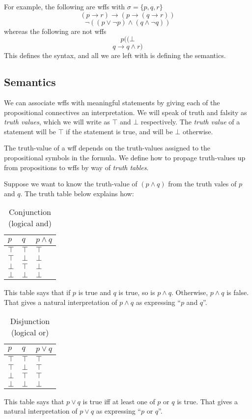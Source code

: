For example, the following are wffs with $\sigma = \{p, q, r\}$
\[
  (p \rightarrow r) \rightarrow (p \rightarrow (q \rightarrow r))
\]
\[
  \lnot((p \vee \lnot p) \land (q \land \lnot q))
\]
whereas the following are not wffs
\[
  p((\bot
\]
\[
  q \rightarrow q \land r)
\]
This defines the syntax, and all we are left with is defining the semantics. 

\subsection*{Semantics}
We can associate wffs with meaningful statements by giving each of the propositional connectives an interpretation. We will speak of truth and falsity as \emph{truth values}, which we will write as $\top$ and $\bot$ respectively. The \emph{truth value} of a statement will be $\top$ if the statement is true, and will be $\bot$ otherwise. 

The truth-value of a wff depends on the truth-values assigned to the propositional symbols in the formula. We define how to propage truth-values up from propositions to wffs by way of \emph{truth tables}.

Suppose we want to know the truth-value of $(p \land q)$ from the truth vales of $p$ and $q$. The truth table below explains how:

\begin{table}[h!]
\centering
\caption{Conjunction (logical and)}
\begin{tabular}{l|l|l}
$p$    & $q$    & $p \land q$ \\ \hline
$\top$ & $\top$ &  $\top$     \\
$\top$ & $\bot$ &  $\bot$   \\
$\bot$ & $\top$ &  $\bot$   \\
$\bot$ & $\bot$ &  $\bot$   
\end{tabular}
\end{table}
This table says that if $p$ is true and $q$ is true, so is $p \land q$. Otherwise, $p \land q$ is false. That gives a natural interpretation of $p \land q$ as expressing ``$p$ and $q$''.

\begin{table}[h!]
\centering
\caption{Disjunction (logical or)}
\begin{tabular}{l|l|l}
$p$    & $q$    & $p \vee q$ \\ \hline
$\top$ & $\top$ & $\top$      \\
$\top$ & $\bot$ & $\top$    \\
$\bot$ & $\top$ & $\top$    \\
$\bot$ & $\bot$ & $\bot$    
\end{tabular}
\end{table}
This table says that $p \vee q$ is true iff at least one of $p$ or $q$ is true. That gives a natural interpretation of $p \vee q$ as expressing ``$p$ or $q$''.

